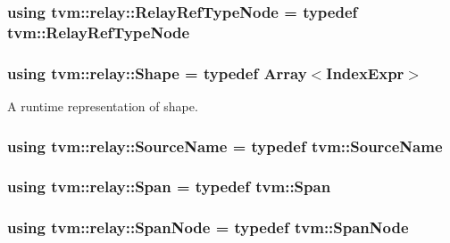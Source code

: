 \subsubsection[{\texorpdfstring{Relay\+Ref\+Type\+Node}{RelayRefTypeNode}}]{\setlength{\rightskip}{0pt plus 5cm}using {\bf tvm\+::relay\+::\+Relay\+Ref\+Type\+Node} = typedef {\bf tvm\+::\+Relay\+Ref\+Type\+Node}}\hypertarget{namespacetvm_1_1relay_ae665239bd9119c8afb037d47781bf237}{}\label{namespacetvm_1_1relay_ae665239bd9119c8afb037d47781bf237}
\subsubsection[{\texorpdfstring{Shape}{Shape}}]{\setlength{\rightskip}{0pt plus 5cm}using {\bf tvm\+::relay\+::\+Shape} = typedef {\bf Array}$<${\bf Index\+Expr}$>$}\hypertarget{namespacetvm_1_1relay_a4d64348ae2b75977e167109fb4af4409}{}\label{namespacetvm_1_1relay_a4d64348ae2b75977e167109fb4af4409}


A runtime representation of shape. 

\subsubsection[{\texorpdfstring{Source\+Name}{SourceName}}]{\setlength{\rightskip}{0pt plus 5cm}using {\bf tvm\+::relay\+::\+Source\+Name} = typedef {\bf tvm\+::\+Source\+Name}}\hypertarget{namespacetvm_1_1relay_a14eacafcb803b0757e48654bb1bac655}{}\label{namespacetvm_1_1relay_a14eacafcb803b0757e48654bb1bac655}
\subsubsection[{\texorpdfstring{Span}{Span}}]{\setlength{\rightskip}{0pt plus 5cm}using {\bf tvm\+::relay\+::\+Span} = typedef {\bf tvm\+::\+Span}}\hypertarget{namespacetvm_1_1relay_af40ca6124bc2e88f2323eeb79d326cc0}{}\label{namespacetvm_1_1relay_af40ca6124bc2e88f2323eeb79d326cc0}
\subsubsection[{\texorpdfstring{Span\+Node}{SpanNode}}]{\setlength{\rightskip}{0pt plus 5cm}using {\bf tvm\+::relay\+::\+Span\+Node} = typedef {\bf tvm\+::\+Span\+Node}}\hypertarget{namespacetvm_1_1relay_a7d0fa6578e97d0d64b08865f94f04827}{}\label{namespacetvm_1_1relay_a7d0fa6578e97d0d64b08865f94f04827}
